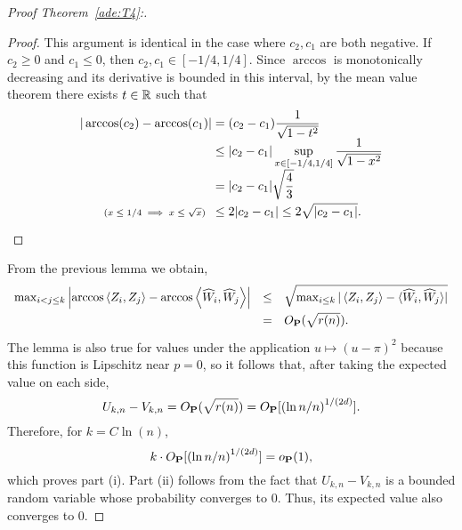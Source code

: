 \begin{proof}[Proof Theorem~\ref{ade:T4}:]
\begin{proof}
    This argument is identical in the case where $c_2, c_1$ are both negative. If $c_2 \geq 0$ and $c_1 \leq 0$, then $c_2, c_1 \in [-1/4, 1/4]$. Since $\arccos$ is monotonically decreasing and its derivative is bounded in this interval, by the mean value theorem there exists $t\in \R$ such that
    \[\everymath{\displaystyle}\arraycolsep=1.4pt\def\arraystretch{1.5} 
      \begin{array}{rcl}
      |\arccos(c_2)-\arccos(c_1)| & = & (c_2-c_1) \frac{1}{\sqrt{1-t^2}}\\
      & \leq & |c_2-c_1| \sup_{x \in [-1/4, 1/4]} \frac{1}{\sqrt{1-x^2}}\\
      & = & |c_2-c_1| \sqrt{\frac{4}{3}} \\
      \text{\scriptsize ($x \leq 1/4 \implies x \leq \sqrt{x} $)}\hspace*{0.5em}  & \leq & 2 |c_2-c_1| \leq 2 \sqrt{|c_2 - c_1|}.
    \end{array} \] 
  \end{proof}
  From the previous lemma we obtain,
  \[ \begin{array}{rcl}
    \max_{i< j \leq k} \left|\arccos\angles{Z_i,Z_j} - \arccos\angles{\widehat{W}_i,\widehat{W}_j}\right| & \leq & \sqrt{\max_{i \leq k} |\angles{Z_i,Z_j} - \langle\widehat{W}_i, \widehat{W}_j\rangle|}\\
    & = & O_\P(\sqrt{r(n)}). 
  \end{array}\] 
  The lemma is also true for values under the application $u\mapsto {(u-\pi)}^2$ because this function is Lipschitz near $p = 0$, so it follows that, after taking the expected value on each side,
  \[ U_{k,n} - V_{k,n} = O_\P(\sqrt{r(n)}) = O_\P [{(\ln n / n)}^{1/(2d)}] .\]
  Therefore, for $k = C \ln(n)$,
  \[ k \cdot O_\P [{(\ln n / n)}^{1/(2d)}] = o_{\P}(1),\]
  which proves part (i). Part (ii) follows from the fact that $ U_{k,n} - V_{k,n}  $ is a bounded random variable whose probability converges to 0. Thus, its expected value also converges to 0.
\end{proof}